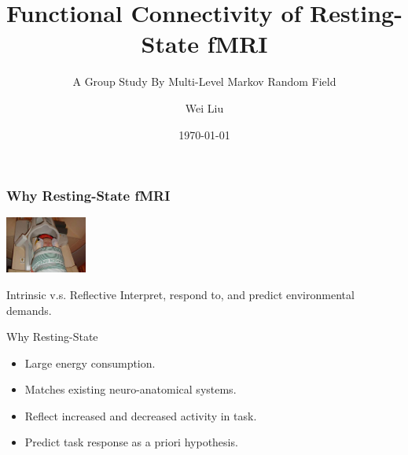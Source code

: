 \documentclass[serif]{beamer}
\title[Functional Connectivity by Multi-Level MRF]{Functional Connectivity of Resting-State fMRI }
\subtitle{A Group Study By Multi-Level Markov Random Field}
\author[W. Liu]{Wei Liu}
\institute[SCI]{
  Scientific Computing and Imaging Institute\\
  University of Utah
}
\date{\today}
\begin{document}
\begin{frame}
  \titlepage
\end{frame}

\begin{frame}
  \frametitle{Why Resting-State fMRI}

  \hfill \includegraphics[width=0.2\textwidth]{sfig/baby}
  \vspace{10pt}
    \begin{block}{Intrinsic v.s. Reflective}
      Interpret, respond to, and predict environmental demands.
  \end{block}

  \begin{block}{Why Resting-State}
    \begin{itemize}
      \item Large energy consumption.
        \item Matches existing neuro-anatomical systems.
          \item Reflect increased and decreased activity in task.
            \item Predict task response as a priori hypothesis.
    \end{itemize}
    \end{block}
\end{frame}
\end{document}
